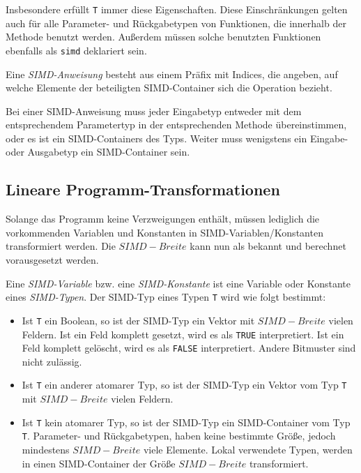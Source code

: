 \documentclass[a4paper,10pt]{article}
\begin{document}
Insbesondere erfüllt \texttt{T} immer diese Eigenschaften. Diese Einschränkungen gelten auch für
alle Parameter- und Rückgabetypen von Funktionen, die innerhalb der Methode benutzt werden. Außerdem
müssen solche benutzten Funktionen ebenfalls als \texttt{simd} deklariert sein.

Eine \emph{SIMD-Anweisung} besteht aus einem Präfix mit Indices, die angeben, auf welche Elemente
der beteiligten SIMD-Container sich die Operation bezieht.

Bei einer SIMD-Anweisung muss jeder Eingabetyp entweder mit dem entsprechendem Parametertyp in der
entsprechenden Methode übereinstimmen, oder es ist ein SIMD-Containers des Typs. Weiter muss
wenigstens ein Eingabe- oder Ausgabetyp ein SIMD-Container sein.

\subsection{Lineare Programm-Transformationen}

Solange das Programm keine Verzweigungen enthält, müssen lediglich die vorkommenden Variablen und
Konstanten in SIMD-Variablen/Konstanten transformiert werden. Die $SIMD-Breite$ kann nun als bekannt
und berechnet vorausgesetzt werden.

Eine \emph{SIMD-Variable} bzw. eine \emph{SIMD-Konstante} ist eine Variable oder Konstante eines
\emph{SIMD-Typen}. Der SIMD-Typ eines Typen \texttt{T} wird wie folgt bestimmt:

\begin{itemize}

    \item Ist \texttt{T} ein Boolean, so ist der SIMD-Typ ein Vektor mit $SIMD-Breite$ vielen Feldern.
    Ist ein Feld komplett gesetzt, wird es als \texttt{TRUE} interpretiert. Ist ein Feld komplett
    gelöscht, wird es als \texttt{FALSE} interpretiert. Andere Bitmuster sind nicht zulässig.

    \item Ist \texttt{T} ein anderer atomarer Typ, so ist der SIMD-Typ ein Vektor vom Typ \texttt{T} mit
    $SIMD-Breite$ vielen Feldern.

    \item Ist \texttt{T} kein atomarer Typ, so ist der SIMD-Typ ein SIMD-Container vom Typ
    \texttt{T}. Parameter- und Rückgabetypen, haben keine bestimmte Größe, jedoch mindestens
    $SIMD-Breite$ viele Elemente. Lokal verwendete Typen, werden in einen SIMD-Container der Größe
    $SIMD-Breite$ transformiert. 

\end{itemize}
\end{document}
